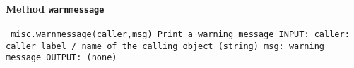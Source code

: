 \paragraph{Method \texttt{warnmessage}}
\vspace{1ex}
\texttt{\newline
misc.warnmessage(caller,msg)\newline
\newline
Print a warning message\newline
\newline
INPUT:\newline
caller: caller label / name of the calling object (string)\newline
msg: warning message\newline
\newline
OUTPUT:\newline
(none)\newline
\newline
}

